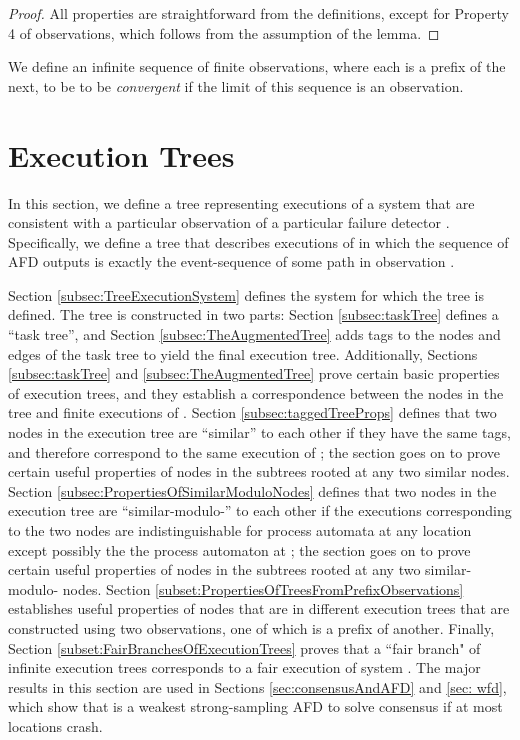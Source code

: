 \documentclass[11pt]{article}
\numberwithin{theorem}{section}
\begin{document}
\begin{proof}
All properties are straightforward from the definitions, except for
Property 4 of observations, which follows from the assumption of the
lemma.
\end{proof}

We define an infinite sequence  of finite observations, where each is a prefix of the next, to be to be \emph{convergent} if the limit  of this sequence is an observation.

\section{Execution Trees}
\label{subsec:treeOfExec}

In this section, we define a tree representing executions of a system
 that are consistent with a particular observation  of a
particular failure detector .
Specifically, we define a tree that describes executions of
 in which the sequence of AFD outputs is exactly the event-sequence
of some path in observation .

Section \ref{subsec:TreeExecutionSystem} defines the system  for which the tree is defined.
The tree is constructed in two parts: Section \ref{subsec:taskTree} defines a ``task tree'', and Section \ref{subsec:TheAugmentedTree} adds tags to the nodes and edges of the task tree to yield the final execution tree. Additionally, Sections \ref{subsec:taskTree}  and \ref{subsec:TheAugmentedTree} prove certain basic properties of execution trees, and they establish a correspondence between the nodes in the tree and finite executions of .
 Section \ref{subsec:taggedTreeProps} defines that two nodes in the execution tree are ``similar'' to each other if they have the same tags, and therefore correspond to the same execution of ; the section goes on to prove certain useful properties of nodes in the subtrees rooted at any two similar nodes. 
 Section \ref{subsec:PropertiesOfSimilarModuloNodes} defines that two nodes in the execution tree are ``similar-modulo-'' to each other if the executions corresponding to the two nodes are indistinguishable for process automata at any location except possibly the the process automaton at ; the section goes on to prove certain useful properties of nodes in the subtrees rooted at any two similar-modulo- nodes. 
 Section \ref{subset:PropertiesOfTreesFromPrefixObservations} establishes useful properties of nodes that are in different execution trees that are constructed using two observations, one of which is a prefix of another. Finally, Section \ref{subset:FairBranchesOfExecutionTrees} proves that a ``fair branch" of infinite execution trees corresponds to a fair execution of system . The major results in this section are used in Sections \ref{sec:consensusAndAFD} and \ref{sec: wfd}, which show that  is a weakest strong-sampling AFD to solve consensus if at most  locations crash.
\end{document}
